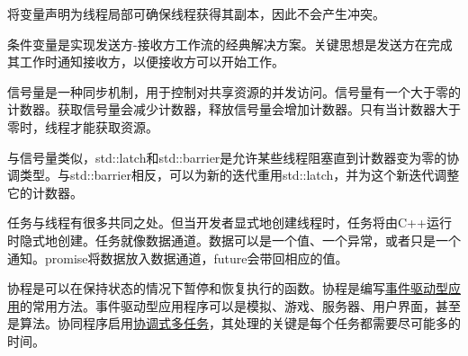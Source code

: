 将变量声明为线程局部可确保线程获得其副本，因此不会产生冲突。

条件变量是实现发送方-接收方工作流的经典解决方案。关键思想是发送方在完成其工作时通知接收方，以便接收方可以开始工作。

信号量是一种同步机制，用于控制对共享资源的并发访问。信号量有一个大于零的计数器。获取信号量会减少计数器，释放信号量会增加计数器。只有当计数器大于零时，线程才能获取资源。

与信号量类似，std::latch和std::barrier是允许某些线程阻塞直到计数器变为零的协调类型。与std::barrier相反，可以为新的迭代重用std::latch，并为这个新迭代调整它的计数器。

任务与线程有很多共同之处。但当开发者显式地创建线程时，任务将由C++运行时隐式地创建。任务就像数据通道。数据可以是一个值、一个异常，或者只是一个通知。promise将数据放入数据通道，future会带回相应的值。

协程是可以在保持状态的情况下暂停和恢复执行的函数。协程是编写\href{https://en.wikipedia.org/wiki/Event-driven_programming}{事件驱动型应用}的常用方法。事件驱动型应用程序可以是模拟、游戏、服务器、用户界面，甚至是算法。协同程序启用\href{https://de.wikipedia.org/wiki/Multitasking}{协调式多任务}，其处理的关键是每个任务都需要尽可能多的时间。